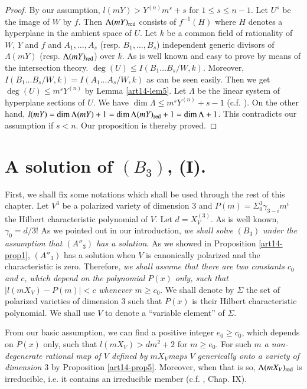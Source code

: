 \begin{proof}
By our assumption, $l(mY)>Y^{(n)}m^{s}+s$ for $1\leq s\leq n-1$. Let $U^{s}$ be the image of $W$ by $f$. Then $\Lambda(mY)_{\operatorname{\mathrm{red}}}$ consists of $f^{-1}(H)$ where $H$ denotes a hyperplane in the ambient space of $U$. Let $k$ be a common field of rationality of $W$, $Y$ and $f$ and $A_{1},\ldots,A_{s}$ (resp. $B_{1},\ldots,B_{s}$) independent generic divisors of $\Lambda(mY)$ (resp. $\Lambda(mY)_{\operatorname{\mathrm{red}}}$) over $k$. As is well known and easy to prove by means of the intersection theory. $\deg(U)\leq I(B_{1}\ldots B_{s}/W,k)$. Moreover, $I(B_{1}\ldots B_{s}/W,k)=I(A_{1}\ldots A_{s}/W,k)$ as can be seen easily. Then we get $\deg (U)\leq m^{s}Y^{(n)}$ by Lemma \ref{art14-lem5}. Let $\Lambda$ be the linear system of hyperplane sections of $U$. We have $\dim \Lambda \leq m^{s}Y^{(n)}+s-1$ (c.f. \cite{art14-key17}). On the other hand, $l(mY)=\dim \Lambda (mY)+1=\dim \Lambda(mY)_{\operatorname{\mathrm{red}}}+1=\dim \Lambda +1$. This contradicts our assumption if $s<n$. Our proposition is thereby proved.
\end{proof}

\section{A solution of \texorpdfstring{$(B_{3})$}{B3}, (I).}\label{art14-sec5}

First, we shall fix some notations which shall be used through the rest of this chapter. Let $V^{3}$ be a polarized variety of dimension 3 and $P(m)=\Sigma^{3}_{0}\gamma_{3-i}m^{i}$ the Hilbert characteristic polynomial of $V$. Let $d=X^{(3)}_{V}$. As is well known, $\gamma_{0}=d/3$! As we pointed out in our introduction, {\em we shall solve} $(B_{3})$ {\em under the assumption that $(A''_{3})$ has a solution}. As we showed in Proposition \ref{art14-prop1}, $(A''_{3})$ has a solution when $V$ is canonically polarized and the characteristic is zero. Therefore, {\em we shall assume that there are two constants $c_{0}$ and $c$, which depend on the polynomial $P(x)$ only, such that $|l(mX_{V})-P(m)|<c$ whenever $m\geq c_{0}$}. We shall denote by $\Sigma$ the set of polarized varieties of dimension 3 such that $P(x)$ is their Hilbert characteristic polynomial. We shall use $V$ to denote a ``variable element'' of $\Sigma$.

From our basic assumption, we can find a positive integer $e_{0}\geq c_{0}$, which depends on $P(x)$ only, such that $l(mX_{V})>dm^{2}+2$ for $m\geq e_{0}$. For such $m$ {\em a non-degenerate rational map of $V$ defined by $mX_{V}$\pageoriginale maps $V$ generically onto a variety of dimension $3$} by Proposition \ref{art14-prop5}. Moreover, when that is so, $\Lambda(mX_{V})_{\operatorname{\mathrm{red}}}$ is irreducible, i.e. it contains an irreducible member (c.f. \cite{art14-key25}, Chap. IX).


